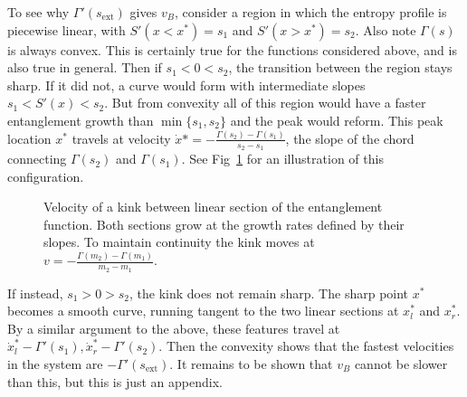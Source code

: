 \documentclass[aps,prx,reprint,superscriptaddress, longbibliography]{revtex4-1}
\newcommand{\charlie}[1]{{\color{Magenta}{{#1}}}}
\begin{document}
To see why $\Gamma'(s_\text{ext})$ gives $v_B$, consider a region in which the entropy profile is piecewise linear, with $S'(x<x^*)=s_1$ and $S'(x>x^*)=s_2$. Also note $\Gamma(s)$ is always convex. This is certainly true for the functions considered above, and is also true in general. Then if $s_1<0<s_2$, the transition between the region stays sharp. If it did not, a curve would form with intermediate slopes $s_1<S'(x)<s_2$. But from convexity all of this region would have a faster entanglement growth than $\min\{s_1,s_2\}$ and the peak would reform. 
This peak location $x^*$ travels at velocity $\dot{x}*=-\frac{\Gamma(s_2)-\Gamma(s_1)}{s_2-s_1}$, the slope of the chord connecting $\Gamma(s_2)$ and $\Gamma(s_1)$. See Fig~\ref{fig:entanglevel} for an illustration of this configuration.
\begin{figure}
	\centering
	
	\caption{Velocity of a kink between linear section of the entanglement function. Both sections grow at the growth rates defined by their slopes. To maintain continuity the kink moves at $v=-\frac{\Gamma(m_2)-\Gamma(m_1)}{m_2-m_1}$.}
	\label{fig:entanglevel}
\end{figure}

If instead, $s_1>0>s_2$, the kink does not remain sharp. The sharp point $x^*$ becomes a smooth curve, running tangent to the two linear sections at $x^*_l$ and $x^*_r$. By a similar argument to the above, these features travel at $\dot{x}^*_l-\Gamma'(s_{1}), \dot{x}^*_r-\Gamma'(s_{2})$. Then the convexity shows that the fastest velocities in the system are $-\Gamma'(s_\text{ext})$. It remains to be shown that $v_B$ cannot be slower than this, but this is just an appendix.


%

%	
%
\end{document}
